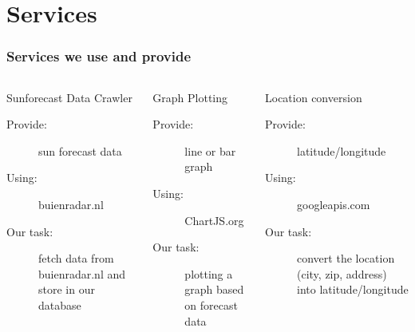 \documentclass{beamer}
\begin{document}
\section{Services}
\frame
{
\frametitle{Services we use and provide}\begin{columns}[c]  
    \begin{block}{Sunforecast Data Crawler}
	\begin{description}
	  \item[Provide:] sun forecast data
	  \item[Using:] buienradar.nl
	  \item[Our task:] fetch data from buienradar.nl and store in our database
	 \end{description}
     \end{block}
     \begin{block}{Graph Plotting}
	\begin{description} 
	  \item[Provide:] line or bar graph
	  \item[Using:] ChartJS.org
	  \item[Our task:] plotting a graph based on forecast data
	\end{description}
     \end{block}
   \begin{block}{Location conversion}
     \begin{description}  
	\item[Provide:] latitude/longitude
	\item[Using:] googleapis.com
	\item[Our task:] convert the location (city, zip, address) into latitude/longitude
     \end{description}
   \end{block}
 \end{columns}
}

 
 
      
\end{document}
